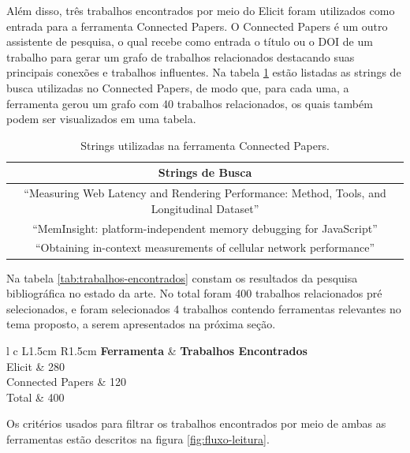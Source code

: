 \documentclass[12pt]{tcc}
\begin{document}
	Além disso, três trabalhos encontrados por meio do Elicit foram utilizados como entrada para a ferramenta Connected Papers. O Connected Papers é um outro assistente de pesquisa, o qual recebe como entrada o título ou o DOI de um trabalho para gerar um grafo de trabalhos relacionados destacando suas principais conexões e trabalhos influentes.	Na tabela \ref{tab:strings-connected-papers} estão listadas as strings de busca utilizadas no Connected Papers, de modo que, para cada uma, a ferramenta gerou um grafo com 40 trabalhos relacionados, os quais também podem ser visualizados em uma tabela.

	\begin{table}[h!]
	\centering
	\caption{Strings utilizadas na ferramenta Connected Papers.}
		\begin{tabular}{||c||} 

		\hline
			Strings de Busca \\
		\hline\hline
		``Measuring Web Latency and Rendering Performance: Method, Tools, and Longitudinal Dataset''\\
		``MemInsight: platform-independent memory debugging for JavaScript''\\
		``Obtaining in-context measurements of cellular network performance''\\
		\hline
		\end{tabular}
		\label{tab:strings-connected-papers}
	\end{table}

	Na tabela \ref{tab:trabalhos-encontrados} constam os resultados da pesquisa bibliográfica no estado da arte. No total foram 400 trabalhos relacionados pré selecionados, e foram selecionados 4 trabalhos contendo ferramentas relevantes no tema proposto, a serem apresentados na próxima seção. 

	\begin{table}[!ht]
		\centering
		\caption{Total de trabalhos encontrados}
		\begin{tabular}{l  c L{1.5cm} R{1.5cm}}
			\toprule
			\textbf{Ferramenta} & \textbf{Trabalhos Encontrados} \\
			\midrule
			Elicit  &  280  \\
			Connected Papers  &  120  \\
			\midrule
			Total  &  400  \\
			\bottomrule
		\end{tabular}
		\label{tab:trabalhos-encontrados}
	\end{table}


	Os critérios usados para filtrar os trabalhos encontrados por meio de ambas as ferramentas estão descritos na figura \ref{fig:fluxo-leitura}.
\end{document}
